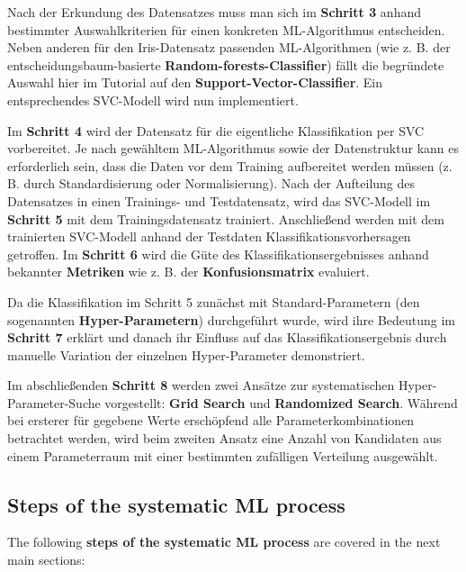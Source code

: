\documentclass [oneside,10pt,a4paper,ngerman,BCOR10mm,headsepline,parindent,final]{scrartcl}
\begin{document}
Nach der Erkundung des Datensatzes muss man sich im \textbf{Schritt 3}
anhand bestimmter Auswahlkriterien für einen konkreten ML-Algorithmus
entscheiden. Neben anderen für den Iris-Datensatz passenden
ML-Algorithmen (wie z. B. der entscheidungsbaum-basierte
\textbf{Random-forests-Classifier}) fällt die begründete Auswahl hier im
Tutorial auf den \textbf{Support-Vector-Classifier}. Ein entsprechendes
SVC-Modell wird nun implementiert.

Im \textbf{Schritt 4} wird der Datensatz für die eigentliche
Klassifikation per SVC vorbereitet. Je nach gewähltem ML-Algorithmus
sowie der Datenstruktur kann es erforderlich sein, dass die Daten vor
dem Training aufbereitet werden müssen (z. B. durch Standardisierung
oder Normalisierung). Nach der Aufteilung des Datensatzes in einen
Trainings- und Testdatensatz, wird das SVC-Modell im \textbf{Schritt 5}
mit dem Trainingsdatensatz trainiert. Anschließend werden mit dem
trainierten SVC-Modell anhand der Testdaten Klassifikationsvorhersagen
getroffen. Im \textbf{Schritt 6} wird die Güte des
Klassifikationsergebnisses anhand bekannter \textbf{Metriken} wie z. B.
der \textbf{Konfusionsmatrix} evaluiert.

Da die Klassifikation im Schritt 5 zunächst mit Standard-Parametern (den
sogenannten \textbf{Hyper-Parametern}) durchgeführt wurde, wird ihre
Bedeutung im \textbf{Schritt 7} erklärt und danach ihr Einfluss auf das
Klassifikationsergebnis durch manuelle Variation der einzelnen
Hyper-Parameter demonstriert.

Im abschließenden \textbf{Schritt 8} werden zwei Ansätze zur
systematischen Hyper-Parameter-Suche vorgestellt: \textbf{Grid Search}
und \textbf{Randomized Search}. Während bei ersterer für gegebene Werte
erschöpfend alle Parameterkombinationen betrachtet werden, wird beim
zweiten Ansatz eine Anzahl von Kandidaten aus einem Parameterraum mit
einer bestimmten zufälligen Verteilung ausgewählt.

    \hypertarget{steps-of-the-systematic-ml-process}{%
\subsection{Steps of the systematic ML
process}\label{steps-of-the-systematic-ml-process}}

The following \textbf{steps of the systematic ML process} are covered in
the next main sections:
\end{document}
